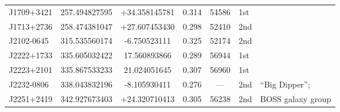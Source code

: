 \begin{table*}
\begin{tabular} {l  cc  cc l l}
J1709+3421   & 257.494827595    &  +34.358145781    & 0.314    & 54586     &   1st     &          \\
J1713+2736   &  258.474381047   &  +27.607453430     & 0.298   & 52410      &  2nd      & \citet{Sheng2019} \\
J2102-0645    &  315.535560174    & -6.750523111        &  0.325 & 52174     &  2nd      &     \\
J2222+1733  &  335.605032422    & 17.560893866        &0.289   & 56944     &   1st       &     \\
J2223+2101   &  335.867533233   &    21.024051645     &0.307   & 56960      &   1st      &      \\
J2232-0806    &   338.043832196  &  -8.105930411       &0.276      & ---      &   2nd     & ``Big Dipper''; \citet{Kynoch2019}  \\
J2251+2419   &  342.927673403   &  +24.320710413      &  0.305 & 56238    &   2nd     & BOSS galaxy  group \\

\end{tabular}
\end{table*}
